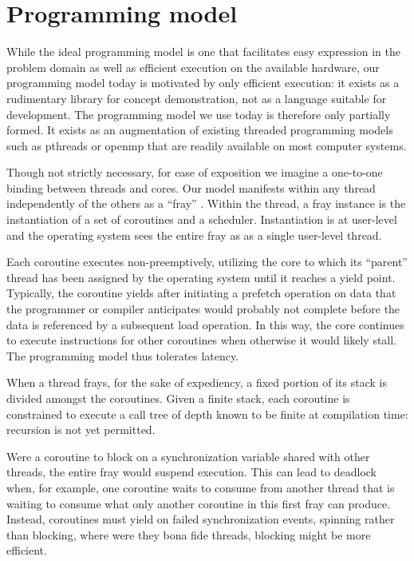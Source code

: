 \documentclass{acm_proc_article-sp}
\begin{document}
\section{Programming model}

While the ideal programming model is one that facilitates easy
expression in the problem domain as well as efficient execution on the
available hardware, our programming model today is motivated by only
efficient execution: it exists as a rudimentary library for concept
demonstration, not as a language suitable for development.  The
programming model we use today is therefore only partially formed. It
exists as an augmentation of existing threaded programming models such
as pthreads or openmp that are readily available on most computer
systems.

Though not strictly necessary, for ease of exposition we imagine a
one-to-one binding between threads and cores.  Our model manifests
within any thread independently of the others as a ``fray'' .  Within the thread, a fray instance is the
instantiation of a set of coroutines and a scheduler.  Instantiation
is at user-level and the operating system sees the entire fray as as a
single user-level thread.


Each coroutine executes non-preemptively, utilizing the core to which
its ``parent'' thread has been assigned by the operating system until it
reaches a yield point.  Typically, the coroutine yields after
initiating a prefetch operation on data that the programmer or
compiler anticipates would probably not complete before the data is
referenced by a subsequent load operation.  In this way, the core
continues to execute instructions for other coroutines when otherwise
it would likely stall.  The programming model thus tolerates latency.


When a thread frays, for the sake of expediency, a fixed portion of
its stack is divided amongst the coroutines.  Given a finite stack,
each coroutine is constrained to execute a call tree of depth known to
be finite at compilation time: recursion is not yet permitted.

 Were a coroutine to
block on a synchronization variable shared with other threads, the
entire fray would suspend execution.  This can lead to deadlock when,
for example, one coroutine waits to consume from another thread that
is waiting to consume what only another coroutine in this first fray
can produce.  Instead, coroutines must yield on failed synchronization
events, spinning rather than blocking, where were they bona fide
threads, blocking might be more efficient.
\end{document}
